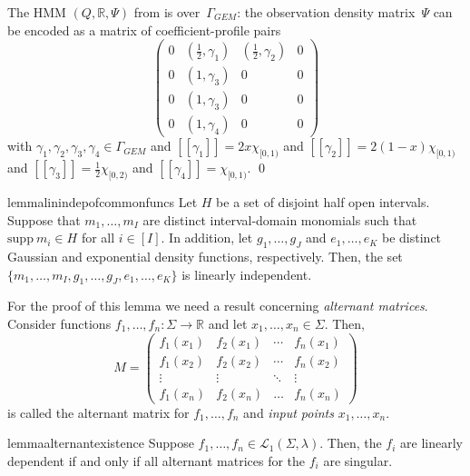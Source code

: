 \documentclass[a4paper,UKenglish,cleveref, autoref,mathscr, amsthm, thmtools, thm-restate]{lipics-v2019}
\newcommand{\RR}{\mathbb{R}}
\newcommand{\1}{\mathbb{I}}
\newcommand{\supp}{\mathrm{supp}}
\newcommand{\pl}{\Gamma_{\mathit{GEM}}}
\begin{document}
\begin{example}\label{profileexample}
The HMM $(Q, \RR, \Psi)$ from  is over~$\pl$: the observation density matrix~$\Psi$ can be encoded as a matrix of coefficient-profile pairs
\[
\begin{pmatrix}
0 & (\frac12, \gamma_1)  & (\frac12,\gamma_2) & 0 \\
0 & (1,\gamma_3) & 0 & 0 \\
0 & (1,\gamma_3) & 0 & 0 \\
0 & (1,\gamma_4) & 0 & 0
\end{pmatrix}
\]
with $\gamma_1, \gamma_2, \gamma_3, \gamma_4 \in \pl$ and
$[\![\gamma_1]\!] = 2x\chi_{[0,1)}$ and
$[\![\gamma_2]\!] = 2(1-x)\chi_{[0,1)}$ and
$[\![\gamma_3]\!] = \frac12 \chi_{[0,2)}$ and
$[\![\gamma_4]\!] = \chi_{[0,1)}$.
\qed
\end{example}

\begin{restatable}{lemma}{linindepofcommonfuncs}\label{linindepofcommonfuncs}
Let $H$ be a set of disjoint half open intervals.
Suppose that $m_1, \dots, m_I$ are distinct interval-domain monomials such that $\supp~m_i \in H$ for all $i \in [I]$. In addition, let $g_1, \dots, g_J$ and $e_1, \dots, e_K$ be distinct Gaussian and exponential density functions, respectively. Then, the set $\{m_1, \dots, m_I, g_1, \dots, g_J, e_1, \dots, e_K\}$ is linearly independent.
\end{restatable}

For the proof of this lemma we need a result concerning \emph{alternant matrices}. Consider functions $f_1, \dots, f_n : \Sigma \rightarrow \RR$ and let $x_1, \dots, x_n \in \Sigma$. Then,
\[M = \begin{pmatrix}
f_1(x_1) &  f_2(x_1) &  \cdots  & f_n(x_1) \\
f_1(x_2) & f_2(x_2) & \cdots  & f_n(x_2) \\
\vdots & \vdots & \ddots & \vdots \\
f_1(x_n) & f_2(x_n) & \dots  & f_n(x_n)
\end{pmatrix}\]
is called the alternant matrix for $f_1, \dots, f_n$ and \emph{input points} $x_1, \dots, x_n$.

\begin{restatable}{lemma}{alternantexistence}\label{alternantexistence}
Suppose $f_1, \dots, f_n \in \mathcal{L}_1(\Sigma, \lambda)$.
Then, the $f_i$ are linearly dependent if and only if all alternant matrices for the $f_i$ are singular.
\end{restatable}
\end{document}
